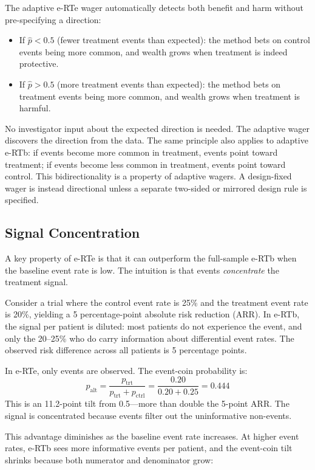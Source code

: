 \documentclass[10pt]{article}
\begin{document}
The adaptive e-RTe wager automatically detects both benefit and harm without pre-specifying a direction:
\begin{itemize}
    \item If $\hat{p} < 0.5$ (fewer treatment events than expected): the method bets on control events being more common, and wealth grows when treatment is indeed protective.
    \item If $\hat{p} > 0.5$ (more treatment events than expected): the method bets on treatment events being more common, and wealth grows when treatment is harmful.
\end{itemize}

No investigator input about the expected direction is needed. The adaptive wager discovers the direction from the data. The same principle also applies to adaptive e-RTb: if events become more common in treatment, events point toward treatment; if events become less common in treatment, events point toward control. This bidirectionality is a property of adaptive wagers. A design-fixed wager is instead directional unless a separate two-sided or mirrored design rule is specified.

\subsection{Signal Concentration}

A key property of e-RTe is that it can outperform the full-sample e-RTb when the baseline event rate is low. The intuition is that events \emph{concentrate} the treatment signal.

Consider a trial where the control event rate is 25\% and the treatment event rate is 20\%, yielding a 5 percentage-point absolute risk reduction (ARR). In e-RTb, the signal per patient is diluted: most patients do not experience the event, and only the 20--25\% who do carry information about differential event rates. The observed risk difference across all patients is 5 percentage points.

In e-RTe, only events are observed. The event-coin probability is:
\begin{equation}
p_{\text{alt}} = \frac{p_{\text{trt}}}{p_{\text{trt}} + p_{\text{ctrl}}} = \frac{0.20}{0.20 + 0.25} = 0.444
\end{equation}
This is an 11.2-point tilt from 0.5---more than double the 5-point ARR. The signal is concentrated because events filter out the uninformative non-events.

This advantage diminishes as the baseline event rate increases. At higher event rates, e-RTb sees more informative events per patient, and the event-coin tilt shrinks because both numerator and denominator grow:
\end{document}
